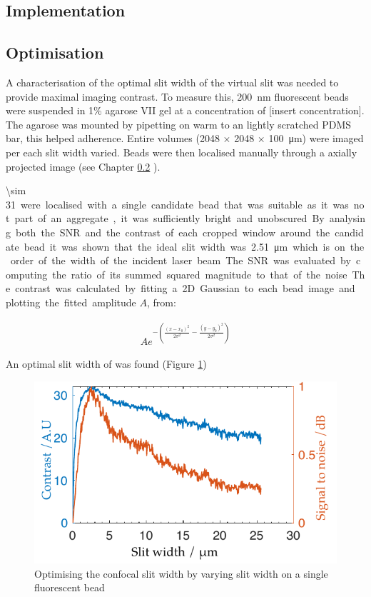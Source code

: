 \subsection{Implementation}



\subsection{Optimisation}

A characterisation of the optimal slit width of the virtual slit was needed to provide maximal imaging contrast.
To measure this, \SI{200}{\nano\metre} fluorescent beads were suspended in 1\% agarose VII gel at a concentration of [insert concentration]. %
The agarose was mounted by pipetting on warm to an lightly scratched PDMS bar, this helped adherence.
Entire volumes (2048 $\times$ 2048 $\times$ \SI{100}{\micro\metre}) were imaged per each slit width varied.
Beads were then localised manually through a axially projected image (see Chapter \ref{} %
).

\SI{\sim 31} were localised with a single candidate bead that was suitable as it was not part of an aggregate, it was sufficiently bright and unobscured
By analysing both the SNR and the contrast of each cropped window around the candidate bead it was shown that the ideal slit width was \SI{2.51}{\micro\metre} which is on the order of the width of the incident laser beam.
The SNR was evaluated by computing the ratio of its summed squared magnitude to that of the noise.
The contrast was calculated by fitting a 2D Gaussian to each bead image and plotting the fitted amplitude $A$, from:

\begin{align}
  A e^{-\left(\frac{(x-x_0)^2}{2\sigma^2}-\frac{(y-y_0)^2}{2\sigma^2}\right)}
\end{align}

An optimal slit width of %
was found (Figure \ref{fig:optimal_slit_snr_contrast})

\begin{figure}
  \centering
  \includegraphics{Chapters/dualslit/Figs/PDF/optimal_slit_snr_contrast}
  \caption{Optimising the confocal slit width by varying slit width on a single fluorescent bead}
  \label{fig:optimal_slit_snr_contrast}
\end{figure}


